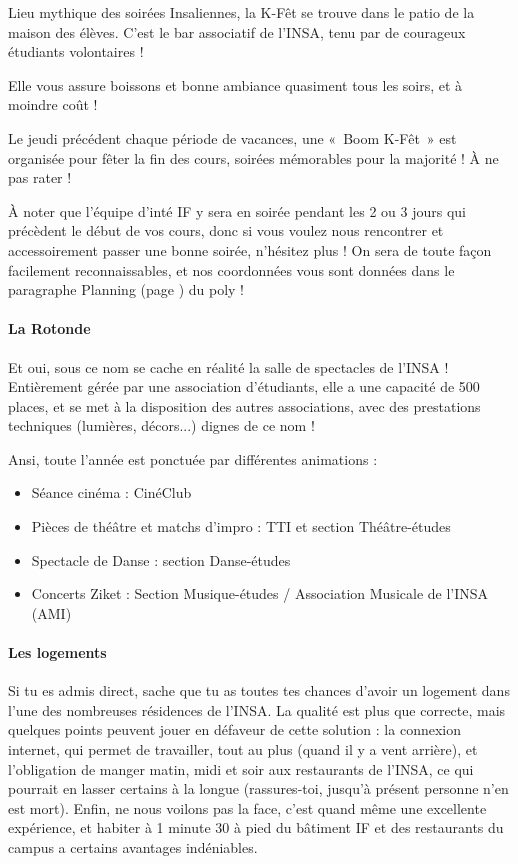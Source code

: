 Lieu mythique des soirées Insaliennes, la K-Fêt se trouve dans le patio de
la maison des élèves. C'est le bar associatif de l'INSA, tenu par de courageux
étudiants volontaires !

Elle vous assure boissons et bonne ambiance quasiment tous les soirs, et à
moindre coût !

Le jeudi précédent chaque période de vacances, une «~Boom K-Fêt~» est organisée
pour fêter la fin des cours, soirées mémorables pour la majorité ! À ne
pas rater !

À noter que l'équipe d'inté IF y sera en soirée pendant les 2 ou 3 jours qui
précèdent le début de vos cours, donc si vous voulez nous rencontrer et
accessoirement passer une bonne soirée, n'hésitez plus ! On sera de toute façon
facilement reconnaissables, et nos coordonnées vous sont données dans le
paragraphe Planning (page \pageref{rplanning}) du poly !

\paragraph{La Rotonde}
Et oui, sous ce nom se cache en réalité la salle de spectacles de l'INSA !
Entièrement gérée par une association d'étudiants, elle a une
capacité de 500 places, et se met à la disposition des autres associations, avec
des prestations techniques (lumières, décors...) dignes de ce nom !

Ansi, toute l'année est ponctuée par différentes animations :
\begin{itemize}
\item  Séance cinéma : CinéClub
\item  Pièces de théâtre et matchs d'impro : TTI et section Théâtre-études
\item  Spectacle de Danse : section Danse-études
\item  Concerts Ziket : Section Musique-études / Association Musicale de l'INSA (AMI) 
\end{itemize}

\paragraph{Les logements}
Si tu es admis direct, sache que tu as toutes tes chances d'avoir un logement
dans l'une des nombreuses résidences de l'INSA. La qualité est plus que correcte,
mais quelques points peuvent jouer en défaveur de cette solution : la connexion internet, qui
permet de travailler, tout au plus (quand il y a
vent arrière), et l'obligation de manger matin, midi et soir aux
restaurants de l'INSA, ce qui pourrait en lasser certains à la longue (rassures-toi, jusqu'à présent personne n'en est mort).
Enfin, ne nous voilons pas la face, c'est quand même une excellente expérience,
et habiter à 1 minute 30 à pied du bâtiment IF et des restaurants du campus a certains avantages indéniables.


